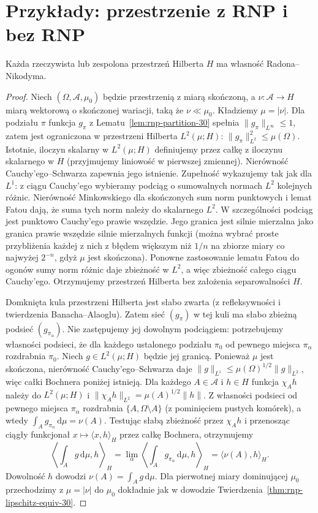\section{Przykłady: przestrzenie z RNP i bez RNP}
\label{sec:rnp-examples-30}
\begin{twierdzenie}
\label{thm:hilbert-rnp-30}
Każda rzeczywista lub zespolona przestrzeń Hilberta $H$
ma własność Radona--Nikodyma.
\end{twierdzenie}
\begin{proof}
Niech $(\Omega,\mathcal A,\mu_0)$ będzie przestrzenią
z miarą skończoną, a $\nu:\mathcal A\to H$ miarą
wektorową o skończonej wariacji, taką że $\nu\ll\mu_0$.
Kładziemy $\mu=|\nu|$. Dla podziału $\pi$ funkcja
$g_\pi$ z Lematu~\ref{lem:rnp-partition-30} spełnia
$\|g_\pi\|_{L^\infty}\le1$, zatem jest ograniczona
w przestrzeni Hilberta $L^2(\mu;H)$:
$\|g_\pi\|_{L^2}^2\le\mu(\Omega)$.
Istotnie, iloczyn skalarny w $L^2(\mu;H)$ definiujemy
przez całkę z iloczynu skalarnego w $H$ (przyjmujemy
liniowość w pierwszej zmiennej). Nierówność
Cauchy'ego--Schwarza zapewnia jego istnienie.
Zupełność wykazujemy tak jak dla $L^1$: z ciągu
Cauchy'ego wybieramy podciąg o sumowalnych normach
$L^2$ kolejnych różnic. Nierówność Minkowskiego
dla skończonych sum norm punktowych i lemat Fatou
dają, że suma tych norm należy do skalarnego $L^2$.
W szczególności podciąg jest punktowo Cauchy'ego
prawie wszędzie. Jego granica jest silnie mierzalna
jako granica prawie wszędzie silnie mierzalnych funkcji
(można wybrać proste przybliżenia każdej z nich
z błędem większym niż $1/n$ na zbiorze miary
co najwyżej $2^{-n}$, gdyż $\mu$ jest skończona).
Ponowne zastosowanie lematu Fatou do ogonów sumy
norm różnic daje zbieżność w $L^2$, a więc zbieżność
całego ciągu Cauchy'ego. Otrzymujemy przestrzeń Hilberta
bez założenia separowalności $H$.

Domknięta kula przestrzeni Hilberta jest słabo zwarta
(z refleksywności i twierdzenia Banacha--Alaoglu).
Zatem sieć $(g_\pi)$ w tej kuli ma słabo zbieżną
podsieć $(g_{\pi_\alpha})$. Nie zastępujemy jej
dowolnym podciągiem: potrzebujemy własności podsieci,
że dla każdego ustalonego podziału $\pi_0$
od pewnego miejsca $\pi_\alpha$ rozdrabnia $\pi_0$.
Niech $g\in L^2(\mu;H)$ będzie jej granicą.
Ponieważ $\mu$ jest skończona, nierówność
Cauchy'ego--Schwarza daje
$\|g\|_{L^1}\le\mu(\Omega)^{1/2}\|g\|_{L^2}$,
więc całki Bochnera poniżej istnieją.
Dla każdego $A\in\mathcal A$ i $h\in H$ funkcja
$\chi_A h$ należy do $L^2(\mu;H)$ i
$\|\chi_Ah\|_{L^2}=\mu(A)^{1/2}\|h\|$.
Z własności podsieci od pewnego miejsca
$\pi_\alpha$ rozdrabnia $\{A,\Omega\setminus A\}$
(z pominięciem pustych komórek), a wtedy
$\int_Ag_{\pi_\alpha}\,\mathrm d\mu=\nu(A)$.
Testując słabą zbieżność przez $\chi_Ah$
i przenosząc ciągły funkcjonał $x\mapsto\langle x,h\rangle_H$
przez całkę Bochnera, otrzymujemy
\[
 \left\langle\int_Ag\,\mathrm d\mu,h\right\rangle_H
 =\lim_\alpha\left\langle
 \int_Ag_{\pi_\alpha}\,\mathrm d\mu,h\right\rangle_H
 =\langle\nu(A),h\rangle_H.
\]
Dowolność $h$ dowodzi $\nu(A)=\int_Ag\,\mathrm d\mu$.
Dla pierwotnej miary dominującej $\mu_0$
przechodzimy z $\mu=|\nu|$ do $\mu_0$ dokładnie jak
w dowodzie Twierdzenia~\ref{thm:rnp-lipschitz-equiv-30}.
\end{proof}

